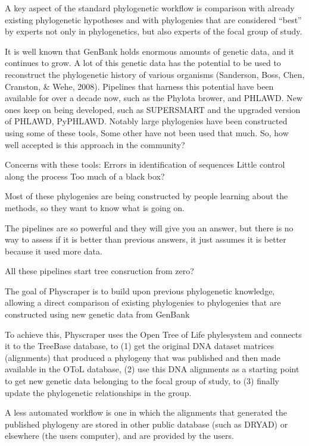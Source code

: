 \documentclass[10pt,a4paper,onecolumn]{article}
\begin{document}
A key aspect of the standard phylogenetic workflow is comparison with
already existing phylogenetic hypotheses and with phylogenies that are
considered ``best'' by experts not only in phylogenetics, but also
experts of the focal group of study.

It is well known that GenBank holds enormous amounts of genetic data,
and it continues to grow. A lot of this genetic data has the potential
to be used to reconstruct the phylogenetic history of various organisms
(Sanderson, Boss, Chen, Cranston, \& Wehe, 2008). Pipelines that harness
this potential have been available for over a decade now, such as the
Phylota brower, and PHLAWD. New ones keep on being developed, such as
SUPERSMART and the upgraded version of PHLAWD, PyPHLAWD. Notably large
phylogenies have been constructed using some of these tools, Some other
have not been used that much. So, how well accepted is this approach in
the community?

Concerns with these tools: Errors in identification of sequences Little
control along the process Too much of a black box?

Most of these phylogenies are being constructed by people learning about
the methods, so they want to know what is going on.

The pipelines are so powerful and they will give you an answer, but
there is no way to assess if it is better than previous answers, it just
assumes it is better because it used more data.

All these pipelines start tree consruction from zero?

The goal of Physcraper is to build upon previous phylogenetic knowledge,
allowing a direct comparison of existing phylogenies to phylogenies that
are constructed using new genetic data from GenBank

To achieve this, Physcraper uses the Open Tree of Life phylesystem and
connects it to the TreeBase database, to (1) get the original DNA
dataset matrices (alignments) that produced a phylogeny that was
published and then made available in the OToL database, (2) use this DNA
alignments as a starting point to get new genetic data belonging to the
focal group of study, to (3) finally update the phylogenetic
relationships in the group.

A less automated workflow is one in which the alignments that generated
the published phylogeny are stored in other public database (such as
DRYAD) or elsewhere (the users computer), and are provided by the users.
\end{document}
